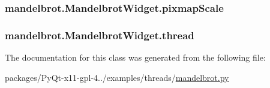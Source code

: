 \subsubsection[{pixmap\+Scale}]{\setlength{\rightskip}{0pt plus 5cm}mandelbrot.\+Mandelbrot\+Widget.\+pixmap\+Scale}\label{classmandelbrot_1_1MandelbrotWidget_a4fccb7d10ff1fb55f062604cd2774cdc}
\hypertarget{classmandelbrot_1_1MandelbrotWidget_a01b3f81b68500d8a4c5071546c8e29a8}{}
\subsubsection[{thread}]{\setlength{\rightskip}{0pt plus 5cm}mandelbrot.\+Mandelbrot\+Widget.\+thread}\label{classmandelbrot_1_1MandelbrotWidget_a01b3f81b68500d8a4c5071546c8e29a8}


The documentation for this class was generated from the following file\+:\begin{DoxyCompactItemize}
\item 
packages/\+Py\+Qt-\/x11-\/gpl-\/4../examples/threads/\hyperlink{mandelbrot_8py}{mandelbrot.\+py}\end{DoxyCompactItemize}

